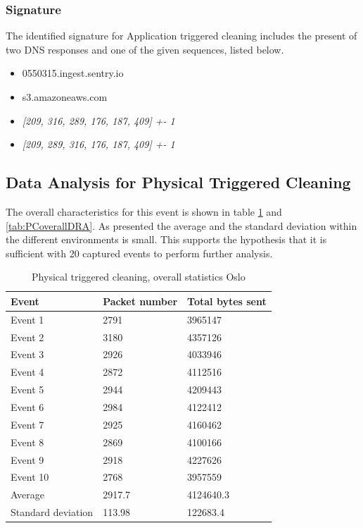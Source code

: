 \subsubsection{Signature}
The identified signature for Application triggered cleaning includes the present of two DNS responses and one of the given sequences, listed below.
\begin{itemize}
    \item 0550315.ingest.sentry.io
    \item s3.amazoneaws.com
    \item \textit{[209, 316, 289, 176, 187, 409] +- 1}
    \item \textit{[209, 289, 316, 176, 187, 409] +- 1}
\end{itemize}

\subsection{Data Analysis for Physical Triggered Cleaning}
The overall characteristics for this event is shown in table \ref{tab:PCoverallOSL} and \ref{tab:PCoverallDRA}. As presented the average and the standard deviation within the different environments is small. This supports the hypothesis that it is sufficient with 20 captured events to perform further analysis.
\begin{table}[H]
\centering
\caption{Physical triggered cleaning, overall statistics Oslo}
\label{tab:PCoverallOSL}
\begin{tabular}{|l|l|l|}
\hline
\textbf{Event} & \textbf{Packet number} & \textbf{Total bytes sent} \\ \hline
Event 1        & 2791                   & 3965147                   \\ \hline
Event 2        & 3180                   & 4357126                   \\ \hline
Event 3        & 2926                   & 4033946                   \\ \hline
Event 4        & 2872                   & 4112516                   \\ \hline
Event 5        & 2944                   & 4209443                   \\ \hline
Event 6        & 2984                   & 4122412                   \\ \hline
Event 7        & 2925                   & 4160462                   \\ \hline
Event 8        & 2869                   & 4100166                   \\ \hline
Event 9        & 2918                   & 4227626                   \\ \hline
Event 10       & 2768                   & 3957559                   \\ \hline
Average        & 2917.7                 & 4124640.3                 \\ \hline
Standard deviation        & 113.98
       & 122683.4               \\ \hline
\end{tabular}
\end{table}


